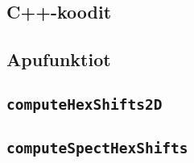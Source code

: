 \begin{appendices}
    \begin{landscape}
        \section{C++-koodit}\label{appendix:code}
        \subsection{Apufunktiot}\label{appendix:apufunktiot}
        \subsection{\texttt{computeHexShifts2D}}\label{appendix:2Dsiirto}
        \subsection{\texttt{computeSpectHexShifts}}\label{appendix:3Dsiirto}
    \end{landscape}
\end{appendices}